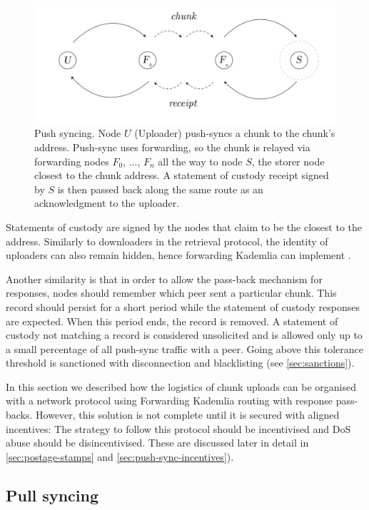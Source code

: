 \begin{figure}[htbp]
   \centering
   \includegraphics[width=\textwidth]{fig/push-sync.pdf}
   \caption[Push syncing \statusgreen]{Push syncing. Node $U$ (Uploader) push-syncs a chunk to the chunk's address. Push-sync uses forwarding, so the chunk is relayed via forwarding nodes $F_0$, ..., $F_n$ all the way to node $S$, the storer node closest to the chunk address. A statement of custody receipt signed by $S$ is then passed back along the same route as an acknowledgment to the uploader.}
   \label{fig:push-syncing}
\end{figure}

Statements of custody are signed by the nodes that claim to be the closest to the address. 
Similarly to downloaders in the retrieval protocol, the identity of uploaders can also remain hidden, hence forwarding Kademlia can implement .

Another similarity is that in order to allow the pass-back mechanism for responses, nodes should remember which peer sent a particular chunk. This record should persist for a short period while the statement of custody responses are expected. When this period ends, the record is removed. A statement of custody not matching a record is considered unsolicited and is allowed only up to a small percentage of all push-sync traffic with a peer. Going above this tolerance threshold is sanctioned with disconnection and blacklisting (see \ref{sec:sanctions}).

In this section we described how the logistics of chunk uploads can be organised with a network protocol using Forwarding Kademlia routing with response pass-backs. However, this solution is not complete until it is secured with aligned incentives: The strategy to follow this protocol should be incentivised and DoS abuse should be disincentivised. These are discussed later in detail in \ref{sec:postage-stamps} and \ref{sec:push-sync-incentives}).

\subsection{Pull syncing\statusgreen}\label{sec:pull-syncing}

